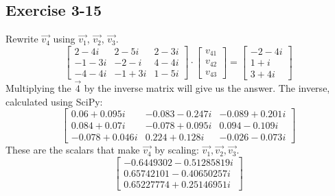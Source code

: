 \documentclass{article}
\begin{document}
        \subsection*{Exercise 3-15}
            Rewrite $\vec{v_4}$ using $\vec{v_1}$, $\vec{v_2}$, $\vec{v_3}$.
            \[
                \begin{bmatrix}
                    2-4i & 2-5i & 2-3i \\
                    -1-3i & -2-i & 4-4i \\
                    -4-4i & -1+3i & 1-5i
                \end{bmatrix}
                \cdot
                \begin{bmatrix}
                    v_{41} \\
                    v_{42} \\
                    v_{43}
                \end{bmatrix}
                =
                \begin{bmatrix}
                    -2-4i \\
                    1+i \\
                    3+4i
                \end{bmatrix}
            \]
            Multiplying the $\Vec{4}$ by the inverse matrix will give us the answer.
            The inverse, calculated using SciPy:
            \[
                \begin{bmatrix}
                    0.06 + 0.095i & -0.083 - 0.247i & -0.089 + 0.201i \\
                    0.084 + 0.07i & -0.078 + 0.095i & 0.094 - 0.109i \\
                    -0.078 + 0.046i & 0.224 + 0.128i & -0.026 - 0.073i
                \end{bmatrix}
            \]
            These are the scalars that make $\Vec{v_4}$ by scaling: $\Vec{v_1},\Vec{v_2},\Vec{v_3}$.
            \[
                \begin{bmatrix}
                    -0.6449302 - 0.51285819i \\
                    0.65742101 - 0.40650257i \\
                    0.65227774 + 0.25146951i
                \end{bmatrix}
            \]

            
\end{document}
